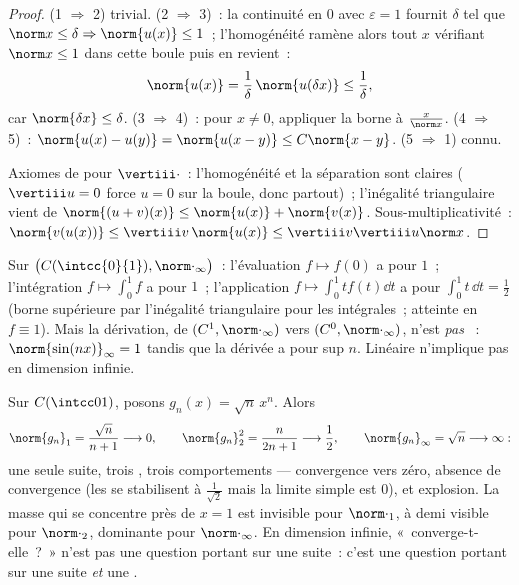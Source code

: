 \begin{proof}
(1 $\Rightarrow$ 2) trivial. (2 $\Rightarrow$ 3)~: la continuité en $0$
avec $\varepsilon = 1$ fournit $\delta$ tel que $\norm x \leq \delta
\Rightarrow \norm{u(x)} \leq 1$~; l'homogénéité ramène alors tout $x$
vérifiant $\norm x \leq 1$ dans cette boule puis en revient~:
\[
\norm{u(x)} = \frac1\delta\,\norm{u(\delta x)} \leq
\frac1\delta ,
\]
car $\norm{\delta x} \leq \delta$. (3 $\Rightarrow$ 4)~:
pour $x \neq 0$, appliquer la borne à $\frac{x}{\norm x}$. (4
$\Rightarrow$ 5)~: $\norm{u(x) - u(y)} = \norm{u(x - y)} \leq
C\norm{x - y}$. (5 $\Rightarrow$ 1) connu.

Axiomes de  pour $\vertiii\cdot$~: l'homogénéité et la séparation
sont claires ($\vertiii u = 0$ force $u = 0$ sur la boule, donc
partout)~; l'inégalité triangulaire vient de $\norm{(u + v)(x)} \leq
\norm{u(x)} + \norm{v(x)}$. Sous-multiplicativité~: $\norm{v(u(x))}
\leq \vertiii v\,\norm{u(x)} \leq \vertiii v \vertiii u \norm x$.
\end{proof}

\begin{example}\label{ex:b2:nvs:operatornorms}
Sur $\bigl(C(\intcc{0}{1}), \norm\cdot_\infty\bigr)$~: l'évaluation
$f \mapsto f(0)$ a pour  $1$~; l'intégration $f \mapsto
\int_0^1 f$ a pour  $1$~; l'application $f \mapsto \int_0^1 t f(t)\dd t$
a pour  $\int_0^1 t\,\dd t = \frac12$ (borne supérieure par
l'inégalité triangulaire pour les intégrales~; atteinte en $f \equiv 1$).
Mais la dérivation, de $(C^1, \norm\cdot_\infty)$ vers $(C^0,
\norm\cdot_\infty)$, n'est \emph{pas} ~: $\norm{\sin(nx)}_\infty
= 1$ tandis que la dérivée a pour  sup $n$. Linéaire n'implique pas
 en dimension infinie.
\end{example}

\begin{example}\label{ex:b2:nvs:sqrtnxn}
Sur $C(\intcc01)$, posons $g_n(x) = \sqrt{n}\,x^n$. Alors
\[
\norm{g_n}_1 = \frac{\sqrt n}{n + 1} \longrightarrow 0,
\qquad
\norm{g_n}_2^2 = \frac{n}{2n + 1} \longrightarrow \frac12,
\qquad
\norm{g_n}_\infty = \sqrt n \longrightarrow \infty :
\]
une seule suite, trois , trois comportements --- convergence vers
zéro, absence de convergence (les  se stabilisent à $\frac1{\sqrt2}$
mais la limite simple est $0$), et explosion. La masse qui se concentre
près de $x = 1$ est invisible pour $\norm\cdot_1$, à demi visible pour
$\norm\cdot_2$, dominante pour $\norm\cdot_\infty$. En dimension infinie,
«~converge-t-elle~?~» n'est pas une question portant sur une suite~:
c'est une question portant sur une suite \emph{et} une .
\end{example}

